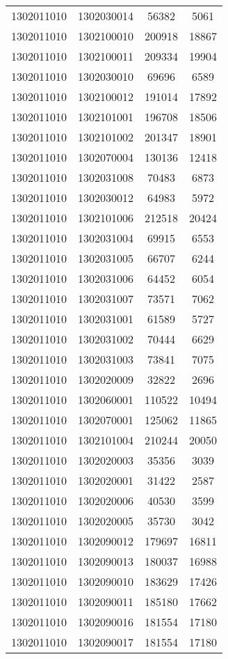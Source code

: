 \begin{longtable}{llcc}
1302011010 & 1302030014 & 56382 & 5061\\
1302011010 & 1302100010 & 200918 & 18867\\
1302011010 & 1302100011 & 209334 & 19904\\
1302011010 & 1302030010 & 69696 & 6589\\
1302011010 & 1302100012 & 191014 & 17892\\
1302011010 & 1302101001 & 196708 & 18506\\
1302011010 & 1302101002 & 201347 & 18901\\
1302011010 & 1302070004 & 130136 & 12418\\
1302011010 & 1302031008 & 70483 & 6873\\
1302011010 & 1302030012 & 64983 & 5972\\
1302011010 & 1302101006 & 212518 & 20424\\
1302011010 & 1302031004 & 69915 & 6553\\
1302011010 & 1302031005 & 66707 & 6244\\
1302011010 & 1302031006 & 64452 & 6054\\
1302011010 & 1302031007 & 73571 & 7062\\
1302011010 & 1302031001 & 61589 & 5727\\
1302011010 & 1302031002 & 70444 & 6629\\
1302011010 & 1302031003 & 73841 & 7075\\
1302011010 & 1302020009 & 32822 & 2696\\
1302011010 & 1302060001 & 110522 & 10494\\
1302011010 & 1302070001 & 125062 & 11865\\
1302011010 & 1302101004 & 210244 & 20050\\
1302011010 & 1302020003 & 35356 & 3039\\
1302011010 & 1302020001 & 31422 & 2587\\
1302011010 & 1302020006 & 40530 & 3599\\
1302011010 & 1302020005 & 35730 & 3042\\
1302011010 & 1302090012 & 179697 & 16811\\
1302011010 & 1302090013 & 180037 & 16988\\
1302011010 & 1302090010 & 183629 & 17426\\
1302011010 & 1302090011 & 185180 & 17662\\
1302011010 & 1302090016 & 181554 & 17180\\
1302011010 & 1302090017 & 181554 & 17180\\

\end{longtable}
